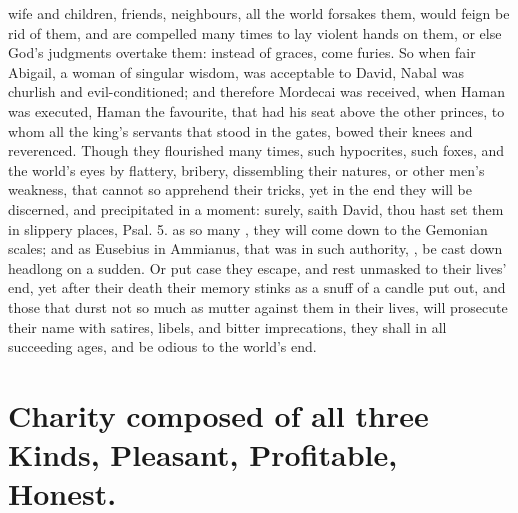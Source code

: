 {wife and children, friends, neighbours, all the world forsakes them,
would feign be rid of them, and are compelled many times to lay violent
hands on them, or else God's judgments overtake them: instead of
graces, come furies. So when fair Abigail, a woman of singular
wisdom, was acceptable to David, Nabal was churlish and
evil-conditioned; and therefore Mordecai was received, when Haman
was executed, Haman the favourite, that had his seat above the other
princes, to whom all the king's servants that stood in the gates, bowed
their knees and reverenced. Though they flourished many times, such
hypocrites, such  foxes, and  the world's eyes by
flattery, bribery, dissembling their natures, or other men's weakness,
that cannot so apprehend their tricks, yet in the end they will be
discerned, and precipitated in a moment: surely, saith David, thou hast
set them in slippery places, Psal.  5. as so many , they
will come down to the Gemonian scales; and as Eusebius in 
Ammianus, that was in such authority, , be cast
down headlong on a sudden. Or put case they escape, and rest unmasked
to their lives' end, yet after their death their memory stinks as a
snuff of a candle put out, and those that durst not so much as mutter
against them in their lives, will prosecute their name with satires,
libels, and bitter imprecations, they shall  in all
succeeding ages, and be odious to the world's end.


\section[Charity]{Charity composed of all three Kinds, Pleasant, Profitable, Honest.}

}
